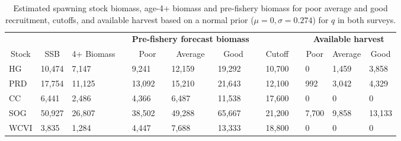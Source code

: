 %
\begin{table}[!tbp]
 \small
 \caption{Estimated spawning stock biomass,  age-4+ biomass and pre-fishery biomass for poor average and good recruitment,  cutoffs, and available harvest based on a normal prior ($\mu=0,\sigma=0.274$) for $q$ in both surveys.\label{TableCatchAdvice}} 
 \begin{center}
 \begin{tabular}{lllclllclclll}\hline\hline
\multicolumn{3}{c}{\bfseries }&
\multicolumn{1}{c}{\bfseries }&
\multicolumn{3}{c}{\bfseries Pre-fishery forecast biomass}&
\multicolumn{1}{c}{\bfseries }&
\multicolumn{1}{c}{\bfseries }&
\multicolumn{1}{c}{\bfseries }&
\multicolumn{3}{c}{\bfseries Available harvest}
\tabularnewline \cline{1-13}
\multicolumn{1}{c}{Stock}&\multicolumn{1}{c}{SSB}&\multicolumn{1}{c}{4+ Biomass}&\multicolumn{1}{c}{}&\multicolumn{1}{c}{Poor}&\multicolumn{1}{c}{Average}&\multicolumn{1}{c}{Good}&\multicolumn{1}{c}{}&\multicolumn{1}{c}{Cutoff}&\multicolumn{1}{c}{}&\multicolumn{1}{c}{Poor}&\multicolumn{1}{c}{Average}&\multicolumn{1}{c}{Good}\tabularnewline
\hline
HG&10,474& 7,147&& 9,241&12,159&19,292&&10,700&&     0& 1,459& 3,858\tabularnewline
PRD&17,754&11,125&&13,092&15,210&21,643&&12,100&&   992& 3,042& 4,329\tabularnewline
CC& 6,441& 2,486&& 4,366& 6,487&11,538&&17,600&&     0&     0&     0\tabularnewline
SOG&50,927&26,807&&38,502&49,288&65,667&&21,200&& 7,700& 9,858&13,133\tabularnewline
WCVI& 3,835& 1,284&& 4,447& 7,688&13,333&&18,800&&     0&     0&     0\tabularnewline
\hline
\end{tabular}

\end{center}

\end{table}

